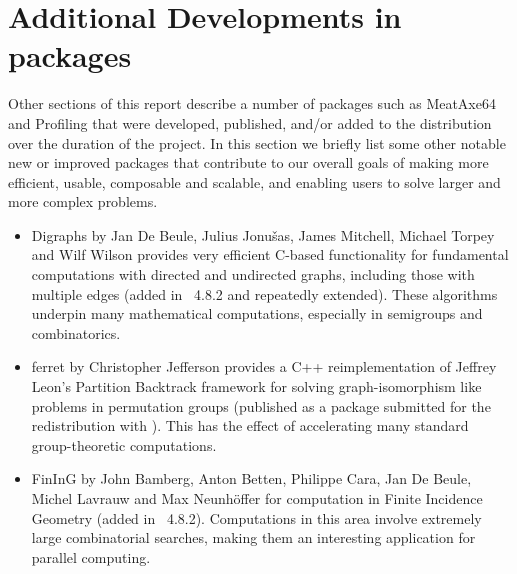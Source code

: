 \section{Additional Developments in \GAP packages} \label{sec:packages}

Other sections of this report describe
a number of \GAP packages such as {\sf MeatAxe64} and {\sf Profiling}
that were developed, published,
and/or added to the \GAP distribution over the duration of the project.  In this section
we briefly list some other notable new or improved packages that
contribute to our overall goals of making \GAP more efficient, usable,
composable and scalable, and enabling users to solve larger and more
complex problems.

\begin{itemize}


\item
{\sf Digraphs} by Jan De Beule, Julius Jonu\v{s}as, James Mitchell,
Michael Torpey and Wilf Wilson \cite{Digraphs} provides very efficient C-based
functionality for fundamental computations with directed and
undirected graphs, including those with multiple edges (added in
\GAP~4.8.2 and repeatedly extended).  These algorithms underpin many
mathematical computations, especially in semigroups and combinatorics.

\item
{\sf ferret} by Christopher Jefferson \cite{ferret} provides a C++
reimplementation of Jeffrey Leon's Partition Backtrack framework for
solving graph-isomorphism like problems in permutation groups
(published as a package submitted for the redistribution with
\GAP). This has the effect of accelerating many standard
group-theoretic computations.

\item
{\sf FinInG} by John Bamberg, Anton Betten, Philippe Cara, Jan De
Beule, Michel Lavrauw and Max Neunh\"offer \cite{fining} for computation in Finite
Incidence Geometry (added in \GAP~4.8.2). Computations in this area
involve extremely large combinatorial searches, making them an
interesting application for parallel computing.


\end{itemize}
